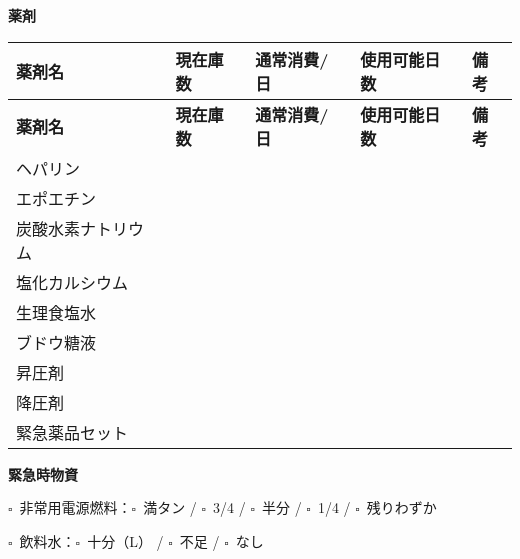\documentclass[a4paper,12pt]{jarticle}
\newcommand{\checkbox}{$\square$\ }
\newcommand{\underlinespace}[1]{\underline{\hspace{#1}}}
\begin{document}
\vspace{5mm}

\begin{center}
\textbf{\large 薬剤}
\end{center}

\vspace{3mm}

\begin{longtable}{|p{3.5cm}|p{2.5cm}|p{2.5cm}|p{2.5cm}|p{2.5cm}|}
\hline
\textbf{薬剤名} & \textbf{現在庫数} & \textbf{通常消費/日} & \textbf{使用可能日数} & \textbf{備考} \\
\hline
\endfirsthead

\hline
\textbf{薬剤名} & \textbf{現在庫数} & \textbf{通常消費/日} & \textbf{使用可能日数} & \textbf{備考} \\
\hline
\endhead

ヘパリン &  &  &  &  \\
\hline
エポエチン &  &  &  &  \\
\hline
炭酸水素ナトリウム &  &  &  &  \\
\hline
塩化カルシウム &  &  &  &  \\
\hline
生理食塩水 &  &  &  &  \\
\hline
ブドウ糖液 &  &  &  &  \\
\hline
昇圧剤 &  &  &  &  \\
\hline
降圧剤 &  &  &  &  \\
\hline
緊急薬品セット &  &  &  &  \\
\hline
\end{longtable}

\vspace{5mm}

\begin{center}
\textbf{\large 緊急時物資}
\end{center}

\vspace{3mm}

\noindent
\checkbox 非常用電源燃料：\quad \checkbox 満タン \quad / \quad \checkbox 3/4 \quad / \quad \checkbox 半分 \quad / \quad \checkbox 1/4 \quad / \quad \checkbox 残りわずか

\vspace{2mm}

\noindent
\checkbox 飲料水：\quad \checkbox 十分（\underlinespace{2cm}L） \quad / \quad \checkbox 不足 \quad / \quad \checkbox なし

\vspace{2mm}
\end{document}
